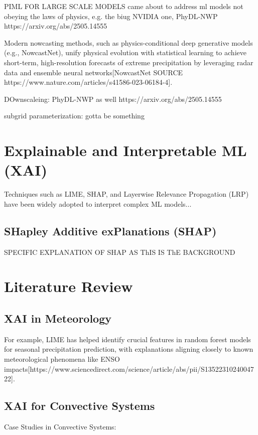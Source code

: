PIML FOR LARGE SCALE MODELS came about to address ml models not obeying the laws of physics, e.g. the biug NVIDIA one, PhyDL-NWP https://arxiv.org/abs/2505.14555

Modern nowcasting methods, such as physics-conditional deep generative models (e.g., NowcastNet), unify physical evolution with statistical learning to achieve short-term, high-resolution forecasts of extreme precipitation by leveraging radar data and ensemble neural networks[NowcastNet SOURCE https://www.nature.com/articles/s41586-023-06184-4]. 

DOwnscaleing: PhyDL-NWP as well https://arxiv.org/abs/2505.14555

subgrid parameterization: gotta be something

\section{Explainable and Interpretable ML (XAI)}

Techniques such as LIME, SHAP, and Layerwise Relevance Propagation (LRP) have been widely adopted to interpret complex ML models...

\subsection{SHapley Additive exPlanations (SHAP)}
SPECIFIC EXPLANATION OF SHAP AS ThIS IS ThE BACKGROUND 

\section{Literature Review}

\subsection{XAI in Meteorology}


For example, LIME has helped identify crucial features in random forest models for seasonal precipitation prediction, with explanations aligning closely to known meteorological phenomena like ENSO impacts[https://www.sciencedirect.com/science/article/abs/pii/S1352231024004722].


\subsection{XAI for Convective Systems}

Case Studies in Convective Systems:

